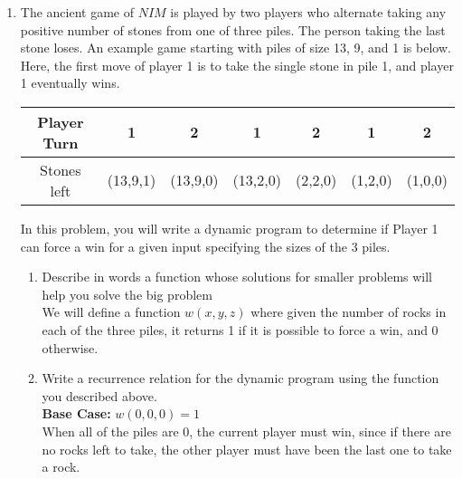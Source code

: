 \documentclass{article}
\begin{document}
\begin{enumerate}
\begin{enumerate}
\end{enumerate}







\item The ancient game of $NIM$ is played by two players who alternate taking any positive number of stones from one of three piles. The person taking the last stone loses. An example game starting with piles of size 13, 9, and 1 is below. Here, the first move of player 1 is to take the single stone in pile 1, and player 1 eventually wins. \\

\begin{table}[h!]
\centering
    \begin{tabular}{|c|c|c|c|c|c|c|}
        \hline
        Player Turn & 1 & 2 & 1 & 2 & 1 & 2 \\ \hline
        Stones left & (13,9,1) & (13,9,0) & (13,2,0) & (2,2,0) & (1,2,0) & (1,0,0) \\ \hline
    \end{tabular}
\end{table}

In this problem, you will write a dynamic program to determine if Player 1 can force a win for a given input specifying the sizes of the 3 piles.
\begin{enumerate}




\item Describe in words a function whose solutions for smaller problems will help you solve the big problem \\

We will define a function $w(x,y,z)$ where given the number of rocks in each of the three piles, it returns 1 if it is possible to force a win, and 0 otherwise. \\




\newpage
\item Write a recurrence relation for the dynamic program using the function you described above. \\

\textbf{Base Case:} $w(0,0,0) = 1$ \\
When all of the piles are 0, the current player must win, since if there are no rocks left to take, the other player must have been the last one to take a rock. \\



\end{enumerate}
\end{enumerate}
\end{document}
